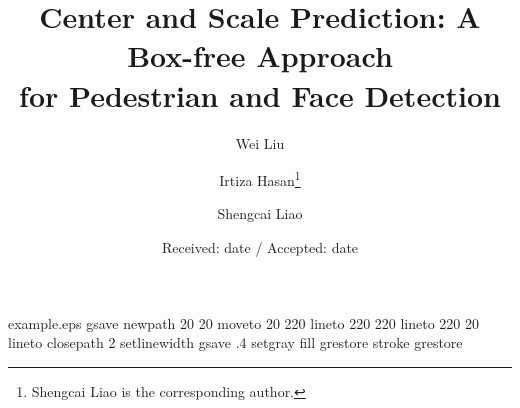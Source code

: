 \begin{filecontents*}{example.eps}
gsave
newpath
  20 20 moveto
  20 220 lineto
  220 220 lineto
  220 20 lineto
closepath
2 setlinewidth
gsave
  .4 setgray fill
grestore
stroke
grestore
\end{filecontents*}
\RequirePackage{fix-cm}
\documentclass[smallextended]{svjour3}       \smartqed  \usepackage{graphicx}
\usepackage{times}
\usepackage{epsfig}
\usepackage{amsmath}
\usepackage{amssymb}
\usepackage{multirow}
\usepackage{color}
\usepackage{url}


\newcommand{\tabincell}[2]{
\begin{tabular}{@{}#1@{}}#2\end{tabular}
}

\title{Center and Scale Prediction: A Box-free Approach\\ for Pedestrian and Face Detection}




\author{Wei Liu \and
        Irtiza Hasan\thanks{Shengcai Liao is the corresponding author.} \and
        Shengcai Liao
}




\date{Received: date / Accepted: date}


\maketitle

